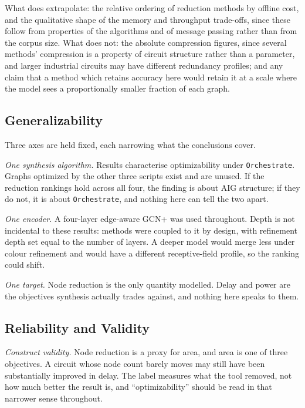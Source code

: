 What does extrapolate: the relative ordering of reduction methods by offline cost, and the
qualitative shape of the memory and throughput trade-offs, since these follow from
properties of the algorithms and of message passing rather than from the corpus size. What
does not: the absolute compression figures, since several methods' compression is a property
of circuit structure rather than a parameter, and larger industrial circuits may have
different redundancy profiles; and any claim that a method which retains accuracy here would
retain it at a scale where the model sees a proportionally smaller fraction of each graph.

\subsection{Generalizability}
\label{sec:discussion:limitations:generalizability}
Three axes are held fixed, each narrowing what the conclusions cover.

\emph{One synthesis algorithm.} Results characterise optimizability under
\texttt{Orchestrate}. Graphs optimized by the other three scripts exist and are unused. If
the reduction rankings hold across all four, the finding is about AIG structure; if they do
not, it is about \texttt{Orchestrate}, and nothing here can tell the two apart.

\emph{One encoder.} A four-layer edge-aware GCN+ was used throughout. Depth is not
incidental to these results: methods were coupled to it by design, with refinement depth set
equal to the number of layers. A deeper model would merge less under colour refinement and
would have a different receptive-field profile, so the ranking could shift.

\emph{One target.} Node reduction is the only quantity modelled. Delay and power are the
objectives synthesis actually trades against, and nothing here speaks to them.

\subsection{Reliability and Validity}
\label{sec:discussion:limitations:validity}
\emph{Construct validity.} Node reduction is a proxy for area, and area is one of three
objectives. A circuit whose node count barely moves may still have been substantially
improved in delay. The label measures what the tool removed, not how much better the result
is, and ``optimizability'' should be read in that narrower sense throughout.


